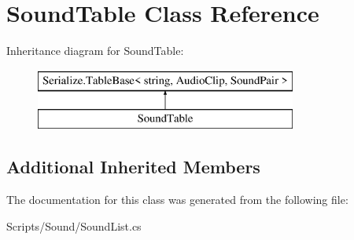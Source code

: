 \hypertarget{class_sound_table}{}\section{Sound\+Table Class Reference}
\label{class_sound_table}
Inheritance diagram for Sound\+Table\+:\begin{figure}[H]
\begin{center}
\leavevmode
\includegraphics[height=2.000000cm]{class_sound_table}
\end{center}
\end{figure}
\subsection*{Additional Inherited Members}


The documentation for this class was generated from the following file\+:\begin{DoxyCompactItemize}
\item 
Scripts/\+Sound/Sound\+List.\+cs\end{DoxyCompactItemize}
